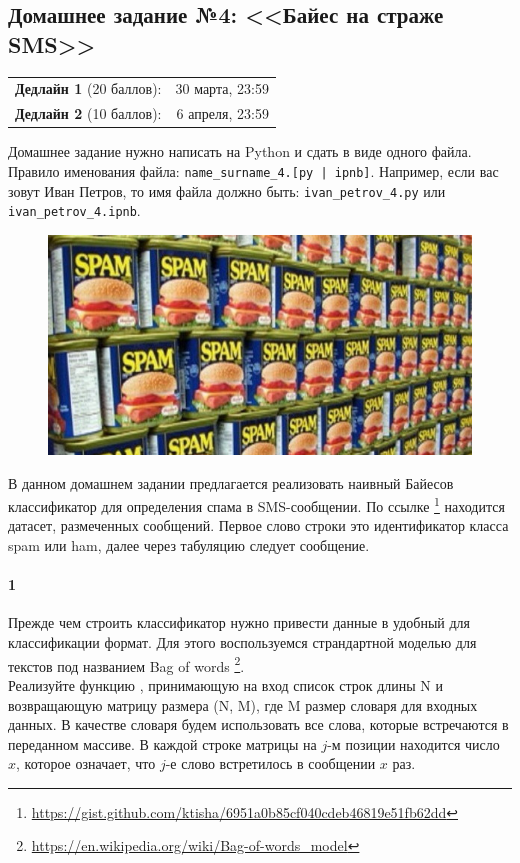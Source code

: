 \documentclass[a4paper,12pt]{article}
\begin{document}
\subsection*{Домашнее задание №4: <<Байес на страже SMS>>}

\begin{tabular}{@{}lr}
  \textbf{Дедлайн 1} (20 баллов): & 30 марта, 23:59 \\
  \textbf{Дедлайн 2} (10 баллов): & 6 апреля, 23:59
\end{tabular}

Домашнее задание нужно написать на Python и сдать в виде одного файла.
Правило именования файла: \texttt{name\_surname\_4.[py | ipnb]}. Например, если
вас зовут Иван Петров, то имя файла должно быть: \texttt{ivan\_petrov\_4.py} или \texttt{ivan\_petrov\_4.ipnb}.

\makebox[\linewidth]{\hrulefill}

\begin{figure}[h!]
  \centering
  \includegraphics[width=.8\linewidth]{images/spam}
\end{figure}

В данном домашнем задании предлагается реализовать наивный Байесов классификатор для определения спама в SMS-сообщении. По ссылке \footnote{\url{https://gist.github.com/ktisha/6951a0b85cf040cdeb46819e51fb62dd}} находится датасет, размеченных сообщений. Первое слово строки это идентификатор класса spam или ham, далее через табуляцию следует сообщение.

\paragraph{1} Прежде чем строить классификатор нужно привести данные в удобный для классификации формат. Для этого воспользуемся страндартной моделью для текстов под названием Bag of words \footnote{\url{https://en.wikipedia.org/wiki/Bag-of-words_model}}.\\ Реализуйте функцию , принимающую на вход список строк длины N и возвращающую матрицу размера (N, M), где M размер словаря для входных данных. В качестве словаря будем использовать все слова, которые встречаются в переданном массиве. 
В каждой строке матрицы на $j$-м позиции находится число $x$, которое означает, что $j$-е слово встретилось в сообщении $x$ раз.
\end{document}
